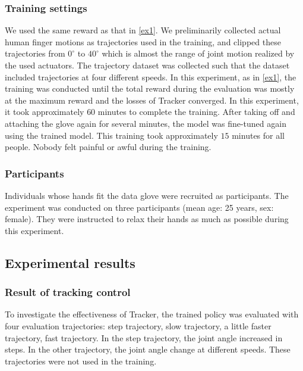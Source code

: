 \documentclass[letterpaper, 10 pt, conference]{ieeeconf}  %
\begin{document}
\subsubsection{Training settings}
 We used the same reward as that in \ref{ex1}. 
We preliminarily collected actual human finger motions as trajectories used in the training, and clipped these trajectories from $0^\circ$ to $40^\circ$ which is almost the range of joint motion realized by the used actuators. The trajectory dataset was collected such that the dataset included trajectories at four different speeds. In this experiment, as in \ref{ex1}, 
the training was conducted until the total reward during the evaluation was mostly at the maximum reward and the losses of Tracker converged.
In this experiment, it took approximately $60$ minutes to complete the training. After taking off and attaching the glove again for several minutes, the model was fine-tuned again using the trained model. This training took approximately $15$ minutes for all people. Nobody felt painful or awful during the training.

\subsubsection{Participants}
Individuals whose hands fit the data glove were recruited as participants. The experiment was conducted on three participants (mean age: 25 years, sex: female). They were instructed to relax their hands as much as possible during this experiment.

\subsection{Experimental results}

\subsubsection{Result of tracking control}

To investigate the effectiveness of Tracker, the trained policy was evaluated with four evaluation trajectories: step trajectory, slow trajectory, a little faster trajectory, fast trajectory. In the step trajectory, the joint angle increased in steps. In the other trajectory, the joint angle change at different speeds.
These trajectories were not used in the training.
\end{document}
